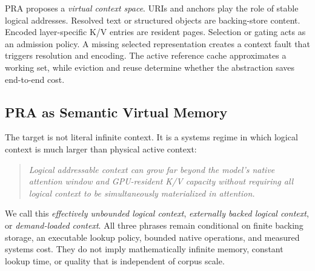 \documentclass[11pt]{article}
\begin{document}
PRA proposes a \emph{virtual context space}. URIs and anchors play the role of stable logical addresses. Resolved text or structured objects are backing-store content. Encoded layer-specific K/V entries are resident pages. Selection or gating acts as an admission policy. A missing selected representation creates a context fault that triggers resolution and encoding. The active reference cache approximates a working set, while eviction and reuse determine whether the abstraction saves end-to-end cost.

\subsection{PRA as Semantic Virtual Memory}

The target is not literal infinite context.  It is a systems regime in which logical context is
much larger than physical active context:
\begin{quote}
\emph{Logical addressable context can grow far beyond the model's native attention window and
GPU-resident K/V capacity without requiring all logical context to be simultaneously materialized
in attention.}
\end{quote}
We call this \emph{effectively unbounded logical context}, \emph{externally backed logical
context}, or \emph{demand-loaded context}.  All three phrases remain conditional on finite
backing storage, an executable lookup policy, bounded native operations, and measured systems
cost.  They do not imply mathematically infinite memory, constant lookup time, or quality that is
independent of corpus scale.
\end{document}
